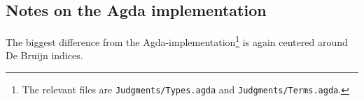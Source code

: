 \begin{mathpar}
\end{mathpar}

\fbox{$\ofprogram{\highlang}$}

\subsection{Notes on the Agda implementation}

The biggest difference from the Agda-implementation\footnote{The relevant files
  are \texttt{Judgments/Types.agda} and \texttt{Judgments/Terms.agda}.} is again
centered around De Bruijn indices.
